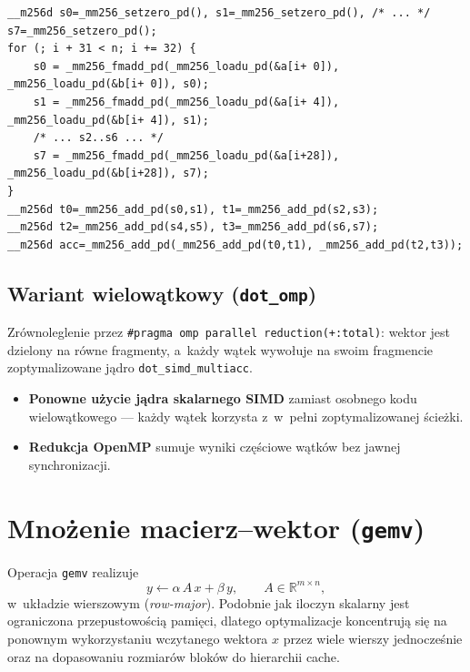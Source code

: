 \documentclass[a4paper,12pt]{book} %
\newcommand{\kod}[1]{\texttt{#1}}
\begin{document}
\begin{lstfloat}[htbp]
\lstset{language=C}
\begin{lstlisting}[caption={Jądro iloczynu skalarnego z~ośmioma niezależnymi akumulatorami (\kod{dot\_simd\_multiacc.c}).}, label={lst:dot-multiacc}]
__m256d s0=_mm256_setzero_pd(), s1=_mm256_setzero_pd(), /* ... */ s7=_mm256_setzero_pd();
for (; i + 31 < n; i += 32) {
    s0 = _mm256_fmadd_pd(_mm256_loadu_pd(&a[i+ 0]), _mm256_loadu_pd(&b[i+ 0]), s0);
    s1 = _mm256_fmadd_pd(_mm256_loadu_pd(&a[i+ 4]), _mm256_loadu_pd(&b[i+ 4]), s1);
    /* ... s2..s6 ... */
    s7 = _mm256_fmadd_pd(_mm256_loadu_pd(&a[i+28]), _mm256_loadu_pd(&b[i+28]), s7);
}
__m256d t0=_mm256_add_pd(s0,s1), t1=_mm256_add_pd(s2,s3);
__m256d t2=_mm256_add_pd(s4,s5), t3=_mm256_add_pd(s6,s7);
__m256d acc=_mm256_add_pd(_mm256_add_pd(t0,t1), _mm256_add_pd(t2,t3));
\end{lstlisting}
\end{lstfloat}

\subsection{Wariant wielowątkowy (\kod{dot\_omp})}
Zrównoleglenie przez \kod{\#pragma omp parallel reduction(+:total)}: wektor jest
dzielony na równe fragmenty, a~każdy wątek wywołuje na swoim fragmencie
zoptymalizowane jądro \kod{dot\_simd\_multiacc}.
\begin{itemize}
\item \textbf{Ponowne użycie jądra skalarnego SIMD} zamiast osobnego kodu
  wielowątkowego --- każdy wątek korzysta z~w~pełni zoptymalizowanej ścieżki.
\item \textbf{Redukcja OpenMP} sumuje wyniki częściowe wątków bez jawnej
  synchronizacji.
\end{itemize}

\section{Mnożenie macierz--wektor (\kod{gemv})}
\label{sec:gemv}

Operacja \kod{gemv} realizuje
\begin{equation}
y \leftarrow \alpha\,A\,x + \beta\,y,\qquad A\in\mathbb{R}^{m\times n},
\label{eq:gemv}
\end{equation}
w~układzie wierszowym (\emph{row-major}). Podobnie jak iloczyn skalarny jest
ograniczona przepustowością pamięci, dlatego optymalizacje koncentrują się na
ponownym wykorzystaniu wczytanego wektora $x$ przez wiele wierszy jednocześnie
oraz na dopasowaniu rozmiarów bloków do hierarchii cache.
\end{document}
